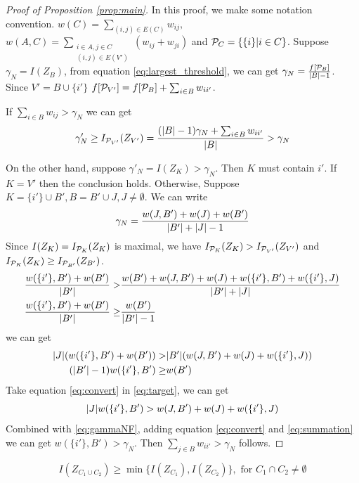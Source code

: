 \begin{proof}[Proof of Proposition \ref{prop:main}]
		In this proof, we make some notation convention.
		$w(C) = \displaystyle\sum_{(i,j) \in E(C)} w_{ij},$
		$w(A, C) = \displaystyle\sum_{\substack{i \in A, j \in C \\ (i,j) \in E(V')}} (w_{ij}+w_{ji})$ and
		$\P_C = \{\{i \}| i \in C \}$. Suppose $\gamma_N = I(Z_B)$, from equation \eqref{eq:largest_threshold}, we can get $\gamma_N =\frac{f[\P_B]} {\abs{B} -1}$.
		Since $V' = B \cup \{i'\}$
		$f[\P_{V'}] = f[\P_B] + \sum_{i \in B}w_{ii'}$.
		
		If $ \sum_{i \in B} w_{ij} > \gamma_N$ we can get
		$$
		\gamma'_N \geq I_{\P_{V'}}(Z_{V'}) = \frac{(\abs{B}-1)\gamma_N + \sum_{i \in B}w_{ii'}}{\abs{B}} > \gamma_N
		$$
		
		On the other hand, suppose $\gamma'_N = I(Z_K) > \gamma_N$. Then $K$ must contain $i'$. If $K=V'$ then the conclusion holds. Otherwise, Suppose $K = \{i'\} \cup B', B=B'\cup J, J\neq \emptyset$. We can write 
		\begin{equation}\label{eq:gammaNF}
		\gamma_N = \frac{w(J,B') + w(J) + w(B')}{ \abs{B'} + \abs{J} - 1 }
		\end{equation}
		Since $I(Z_K) = I_{\P_K}(Z_K)$ is maximal, we have $I_{\P_K}(Z_K) > I_{\P_{V'}}(Z_{V'})$ and $I_{\P_K}(Z_K) \geq I_{\P_{B'}}(Z_{B'})$.
		\begin{align*}
			\frac{w(\{i'\}, B') + w(B')}{\abs{B'}} >& \frac{w(B') + w(J, B') + w(J) + w(\{i'\}, B') + w(\{i'\}, J)}{\abs{B'} + \abs{J}}  \\
			\frac{w(\{i'\}, B') + w(B')}{\abs{B'}} \geq & \frac{w(B')}{\abs{B'} - 1}
		\end{align*}
		we can get 
		\begin{align}
			\abs{J} (w(\{i'\}, B') + w(B')) > & \abs{B'} (w(J, B') + w(J) + w(\{i'\}, J)) \label{eq:target}
			\\
			(\abs{B'} - 1)  w(\{i'\}, B') \geq & w(B') \label{eq:convert}
		\end{align}
		Take equation \eqref{eq:convert} in \eqref{eq:target}, we can get
		\begin{equation}\label{eq:summation}
		\abs{J} w(\{i'\}, B') > w(J, B') + w(J) + w(\{i'\}, J)
		\end{equation}	
		Combined with \eqref{eq:gammaNF}, adding equation \eqref{eq:convert} and \eqref{eq:summation} we can get
		$w(\{i'\}, B') > \gamma_N$. Then $\sum_{j \in B}w_{ii'} > \gamma_N $ follows.
\end{proof}
\begin{lemma}\label{lemma:laminarity}
\begin{equation}\label{eq:P}
I(Z_{C_1 \cup C_2}) \geq \min\{ I(Z_{C_1}), I(Z_{C_2})\}, \textrm{ for } C_1\cap C_2 \neq \emptyset
\end{equation}
\end{lemma}
